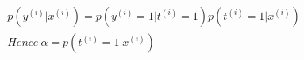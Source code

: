 \begin{answer}
    $$
    \begin{aligned}
    p(y^{(i)}|x^{(i)}) = p(y^{(i)} = 1 | t^{(i)} = 1)p(t^{(i)} = 1| x^{(i)})\\
    Hence\ \alpha = p(t^{(i)} = 1| x^{(i)})
    \end{aligned}
    $$
\end{answer}
